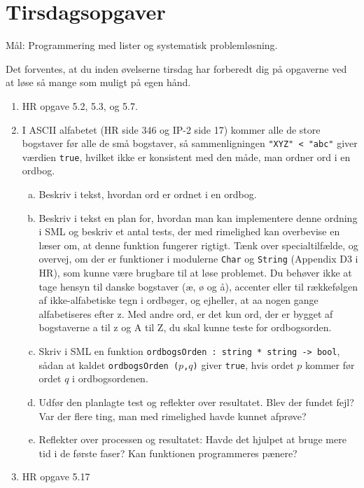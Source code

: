 \documentclass[a4paper,12pt]{article}
\begin{document}
\section{Tirsdagsopgaver}
\label{sec:tirsdagsopgaver}

Mål: Programmering med lister og systematisk problemløsning.

Det forventes, at du inden øvelserne tirsdag har forberedt dig på
opgaverne ved at løse så mange som muligt på egen hånd.

\begin{enumerate}[{2}T1]
 \item HR opgave 5.2, 5.3, og 5.7.
 \item I ASCII alfabetet (HR side 346 og IP-2 side 17) kommer alle de
   store bogstaver før alle de små bogstaver, så sammenligningen
   \texttt{"XYZ"\,<\,"abc"} giver værdien \texttt{true}, hvilket ikke
   er konsistent med den måde, man ordner ord i en ordbog.

\begin{enumerate}[(a)]

   \item Beskriv i tekst, hvordan ord er ordnet i en ordbog.

   \item Beskriv i tekst en plan for, hvordan man kan implementere
     denne ordning i SML og beskriv et antal tests, der med rimelighed
     kan overbevise en læser om, at denne funktion fungerer rigtigt.
     Tænk over specialtilfælde, og overvej, om der er funktioner i
     modulerne \texttt{Char} og \texttt{String} (Appendix D3 i HR),
     som kunne være brugbare til at løse problemet.  Du behøver ikke
     at tage hensyn til danske bogstaver (æ, ø og å), accenter eller
     til rækkefølgen af ikke-alfabetiske tegn i ordbøger, og ejheller,
     at aa nogen gange alfabetiseres efter z.  Med andre ord, er det
     kun ord, der er bygget af bogstaverne a til z og A til Z, du skal
     kunne teste for ordbogsorden.

   \item Skriv i SML en funktion
     \texttt{ordbogsOrden\,:\,string\,*\,string\,->\,bool}, sådan at
     kaldet \texttt{ordbogsOrden ($p$,$q$)} giver \texttt{true}, hvis
     ordet $p$ kommer før ordet $q$ i ordbogsordenen.

   \item Udfør den planlagte test og reflekter over resultatet.  Blev
     der fundet fejl? Var der flere ting, man med rimelighed havde kunnet
     afprøve?

   \item Reflekter over processen og resultatet: Havde det hjulpet at
     bruge mere tid i de første faser?  Kan funktionen programmeres
     pænere?

  \end{enumerate}
\item HR opgave 5.17

\end{enumerate}
\end{document}
